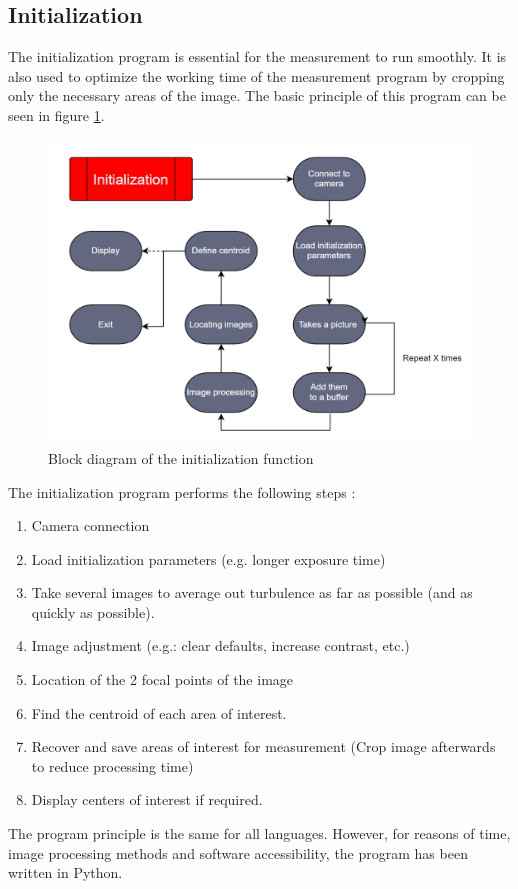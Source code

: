 \subsection{Initialization}
The initialization program is essential for the measurement to run smoothly. It is also used to optimize the working
time of the measurement program by cropping only the necessary areas of the image. The basic principle of this program
can be seen in figure \ref{fig:Soft_Init}.
\begin{figure}[H]
    \centering
    \includegraphics[scale=0.85]{assets/figures/Software/Initialization.png}
    \caption{Block diagram of the initialization function}
    \label{fig:Soft_Init}
\end{figure}
The initialization program performs the following steps :
\begin{enumerate}
    \item Camera connection
    \item Load initialization parameters (e.g. longer exposure time)
    \item Take several images to average out turbulence as far as possible (and as quickly as possible).
    \item Image adjustment (e.g.: clear defaults, increase contrast, etc.)
    \item Location of the 2 focal points of the image
    \item Find the centroid of each area of interest.
    \item Recover and save areas of interest for measurement (Crop image afterwards to reduce processing time)
    \item Display centers of interest if required.
\end{enumerate}
The program principle is the same for all languages. However, for reasons of time, image processing methods and 
software accessibility, the program has been written in Python.
\newpage
